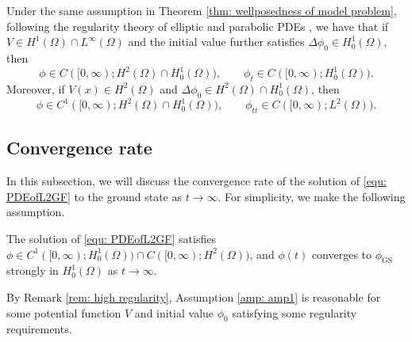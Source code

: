 \documentclass{siamart250211}
\begin{document}
\begin{remark}\label{rem: high regularity}
	Under the same assumption in Theorem \ref{thm: wellposedness of model problem}, following the regularity theory of elliptic and parabolic PDEs \cite{evans2010partial,gilbarg2001elliptic}, we have that if $V \in H^1(\Omega) \cap L^{\infty}(\Omega)$ and the initial value further satisfies $\Delta \phi_0 \in H_0^1(\Omega)$, then 
	\begin{equation*}
			\phi \in C([0,\infty); H^2(\Omega) \cap H_0^1(\Omega) ), \qquad \phi_t\in C([0,\infty);  H_0^1(\Omega) ).
		\end{equation*}
		Moreover, if $V(x) \in H^2(\Omega)$ and $\Delta \phi_0 \in H^2(\Omega) \cap H_0^1(\Omega)$, then
		\begin{equation*}
		\phi \in C^1([0,\infty); H^2(\Omega) \cap H_0^1(\Omega)), \qquad \phi_{tt} \in C([0,\infty); L^2(\Omega) ).
	\end{equation*}
\end{remark}

\subsection{Convergence rate}

In this subsection, we will discuss the convergence rate of the solution of \eqref{equ: PDEofL2GF} to the ground state as $t \to \infty$. For simplicity, we make the following assumption.
\begin{amp}\label{amp: amp1}
	The solution of \eqref{equ: PDEofL2GF} satisfies $\phi \in C^1([0,\infty); H_0^1(\Omega)) \cap C([0,\infty); H^2(\Omega))$, and $\phi(t)$ converges to $\phi_{\text{GS}}$ strongly in $H_0^1(\Omega)$ as $t \to \infty$.
\end{amp}
\begin{remark}
    By Remark \ref{rem: high regularity}, Assumption \ref{amp: amp1} is reasonable for some potential function $V$ and initial value $\phi_0$ satisfying some regularity requirements.
\end{remark}
\end{document}
